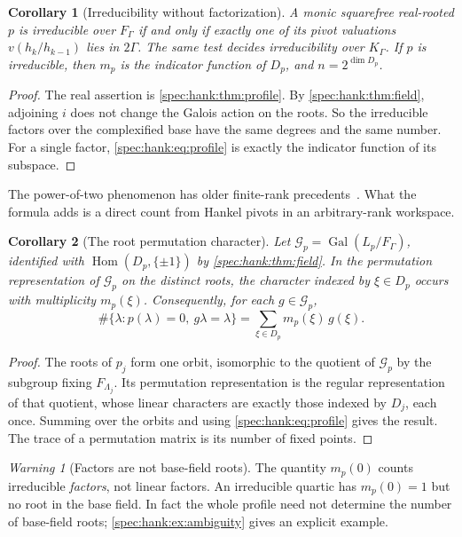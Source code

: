 \documentclass[11pt,a4paper]{article}
\numberwithin{equation}{section}
\newtheorem{corollary}[corollary]{Corollary}
\theoremstyle{definition}
\theoremstyle{remark}
\newtheorem{warning}[warning]{Warning}
\newcommand{\Hom}{\operatorname{Hom}}
\newcommand{\Gal}{\operatorname{Gal}}
\begin{document}
\begin{corollary}[Irreducibility without factorization]\label{spec:hank:cor:irreducible}
A monic squarefree real-rooted $p$ is irreducible over $F_\Gamma$ if and only
if exactly one of its pivot valuations $v(h_k/h_{k-1})$ lies in $2\Gamma$. The
same test decides irreducibility over $K_\Gamma$. If $p$ is irreducible, then
$m_p$ is the indicator function of $D_p$, and $n=2^{\dim D_p}$.
\end{corollary}
\begin{proof}
The real assertion is \cref{spec:hank:thm:profile}. By
\cref{spec:hank:thm:field}, adjoining $i$ does not change the Galois action on
the roots. So the irreducible factors over the complexified base have the
same degrees and the same number. For a single factor,
\eqref{spec:hank:eq:profile} is exactly the indicator function of its
subspace.
\end{proof}

The power-of-two phenomenon has older finite-rank precedents~\cite{KO08}.
What the formula adds is a direct count from Hankel pivots in an
arbitrary-rank workspace.

\begin{corollary}[The root permutation character]\label{spec:hank:cor:character}
Let $\mathcal G_p=\Gal(L_p/F_\Gamma)$, identified with $\Hom(D_p,\{\pm1\})$
by \cref{spec:hank:thm:field}. In the permutation representation of
$\mathcal G_p$ on the distinct roots, the
character indexed by $\xi\in D_p$ occurs with multiplicity $m_p(\xi)$.
Consequently, for each $g\in\mathcal G_p$,
\[
 \#\{\lambda:p(\lambda)=0,\ g\lambda=\lambda\}
     =\sum_{\xi\in D_p}m_p(\xi)\,g(\xi).
\]
\end{corollary}
\begin{proof}
The roots of $p_j$ form one orbit, isomorphic to the quotient of $\mathcal
G_p$ by the subgroup fixing $F_{\Lambda_j}$. Its permutation representation is
the regular representation of that quotient, whose linear characters are
exactly those indexed by $D_j$, each once. Summing over the orbits and using
\eqref{spec:hank:eq:profile} gives the result. The trace of a permutation
matrix is its number of fixed points.
\end{proof}

\begin{warning}[Factors are not base-field roots]\label{spec:hank:warn:factors}
The quantity $m_p(0)$ counts irreducible \emph{factors}, not linear factors.
An irreducible quartic has $m_p(0)=1$ but no root in the base field. In fact
the whole profile need not determine the number of base-field roots;
\cref{spec:hank:ex:ambiguity} gives an explicit example.
\end{warning}
\end{document}
